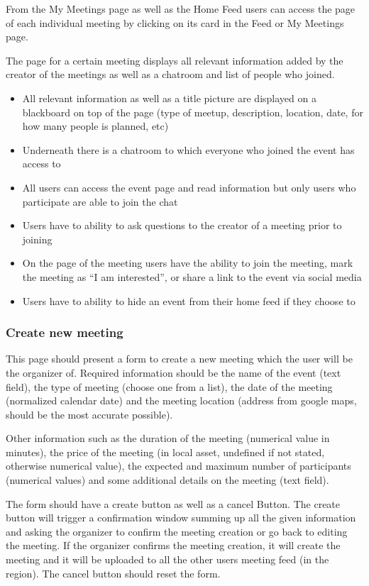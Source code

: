\documentclass[conference]{IEEEtran}
\begin{document}
From the My Meetings page as well as the Home Feed users can access the page of each individual meeting by clicking on its card in the Feed or My Meetings page.

The page for a certain meeting displays all relevant information added by the creator of the meetings as well as a chatroom and list of people who joined.

\begin{itemize}
\item All relevant information as well as a title picture are displayed on a blackboard on top of the page (type of meetup, description, location, date, for how many people is planned, etc)
\item Underneath there is a chatroom to which everyone who joined the event has access to
\item All users can access the event page and read information but only users who participate are able to join the chat
\item Users have to ability to ask questions to the creator of a meeting prior to joining
\item On the page of the meeting users have the ability to join the meeting, mark the meeting as “I am interested”, or share a link to the event via social media
\item Users have to ability to hide an event from their home feed if they choose to
\end{itemize}

\subsubsection{Create new meeting}

This page should present a form to create a new meeting
which the user will be the organizer of. Required information should be the name of the event (text field), the type of meeting (choose one from a list), the date of the meeting (normalized calendar date) and the meeting location (address from google maps, should be the most accurate possible).

Other information such as the duration of the meeting (numerical value in minutes), the price of the meeting (in local asset, undefined if not stated, otherwise numerical value), the expected and maximum number of participants (numerical values) and some additional details on the meeting (text field).

The form should have a create button as well as a cancel Button. The create button will trigger a confirmation window summing up all the given information and asking the organizer to confirm the meeting creation or go back to editing the meeting. If the organizer confirms the meeting creation, it will create the meeting and it will be uploaded to all the other users meeting feed (in the region). The cancel button should reset the form.
\end{document}
